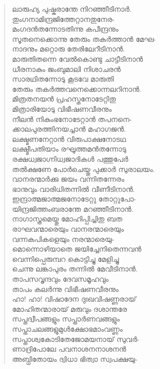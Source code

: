 \begin{verse}
ലാരുഹ്യ പുഷ്കരാന്തേ നിറഞ്ഞീടിനാര്‍.\\
തുംഗനാമിന്ദ്രജിത്തേറ്റാനതുനേര-\\
മംഗദന്‍തന്നോടതിന്നു കപീന്ദ്രനും\\
സൂതനെക്കൊന്നു തേരും തകര്‍ത്താന്‍ മേഘ-\\
നാദനും മറ്റൊരു തേരിലേറീടിനാന്‍.\\
മാരുതിതന്നെ വേല്‍കൊണ്ടു ചാട്ടീടിനാന്‍\\
ധീരനാകും ജംബുമാലി നിശാചരന്‍\\
സാരഥിതന്നോടു കൂടവേ മാരുതി\\
തേരും തകര്‍ത്തവനെക്കൊന്നലറിനാന്‍.\\
മിത്രതനയന്‍ പ്രഹസ്തനോടേറ്റിതു\\
മിത്രാരിയോടു വിഭീഷണവീരനും\\
നീലന്‍ നികുംഭനോടേറ്റാന്‍ തപനനെ-\\
ക്കാലപുരത്തിനയച്ചാന്‍ മഹാഗജന്‍.\\
ലക്ഷ്മണനേറ്റാന്‍ വിരുപാക്ഷനോടഥ\\
ലക്ഷ്മീപതിയാം രഘൂത്തമന്‍തന്നോടു\\
രക്ഷധ്വജാഗ്നിധ്വജാദികള്‍ പത്തുപേര്‍\\
തല്‍ക്ഷണേ പോര്‍ചെയ്തു പുക്കാര്‍ സുരാലയം.\\
വാനരന്മാര്‍ക്കു ജയം വന്നിതന്നേരം\\
ഭാനുവും വാരിധിതന്നില്‍ വീണീടിനാന്‍.\\
ഇന്ദ്രാത്മജാത്മജനോടേറ്റു തോറ്റുപോ-\\
യിന്ദ്രജിത്തംബരാന്തേ മറഞ്ഞീടിനാന്‍.\\
നാഗാസ്ത്രമെയ്തു മോഹിപ്പിച്ചിതു ബത\\
രാഘവന്മാരെയും വാനരന്മാരെയും\\
വന്നകപികളെയും നരന്മാരെയു-\\
മൊന്നൊഴിയാതെ ജയിച്ചേനിതെന്നവന്‍\\
വെന്നിപ്പെരുമ്പറ കൊട്ടിച്ചു മേളിച്ചു\\
ചെന്നു ലങ്കാപുരം തന്നില്‍ മേവീടിനാന്‍.\\
താപസവൃന്ദവും ദേവസമൂഹവും\\
താപം കലര്‍ന്നു വിഭീഷണവീരനും\\
ഹാ! ഹാ! വിഷാദേന ദുഃഖവിഷണ്ണരായ്\\
മോഹിതന്മാരായ് മരുവും ദശാന്തരേ\\
സപ്തദ്വീപങ്ങളും സപ്താര്‍ണവങ്ങളും\\
സപ്താചലങ്ങളുമുള്‍ക്ഷോഭമാംവണ്ണം\\
സപ്താശ്വകോടിതേജോമയനായ് സുവര്‍-\\
ണാദ്രിപോലേ പവനാശനനാശനന്‍\\
അബ്ധിതോയം ദ്വിധാ ഭിത്വാ സ്വപക്ഷയു-\\

\end{verse}
